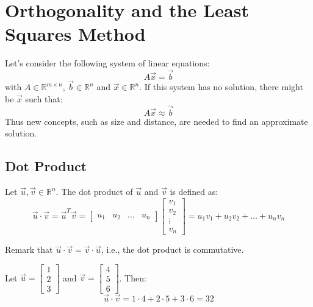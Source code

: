 \chapter{Orthogonality and the Least Squares Method}
Let's consider the following system of linear equations:
\[
    A \vec{x} = \vec{b}
\]
with $A \in \mathbb{R}^{m \times n}$, $\vec{b} \in \mathbb{R}^n$ and $\vec{x} \in \mathbb{R}^n$. If this system has no solution, there might be $\vec{x}$ such that:
\[
    A \vec{x} \approx \vec{b}
\]
Thus new concepts, such as size and distance, are needed to find an approximate solution.

\section{Dot Product}
\begin{definition}
    Let $\vec{u}, \vec{v} \in \mathbb{R}^n$. The dot product of $\vec{u}$ and $\vec{v}$ is defined as:
    \[
        \vec{u} \cdot \vec{v} = \vec{u}^T \vec{v} = \begin{bmatrix}
            u_1 & u_2 & \ldots & u_n
        \end{bmatrix} \begin{bmatrix}
            v_1 \\ v_2 \\ \vdots \\ v_n
        \end{bmatrix} = u_1 v_1 + u_2 v_2 + \ldots + u_n v_n
    \]
\end{definition}
Remark that $\vec{u} \cdot \vec{v} = \vec{v} \cdot \vec{u}$, i.e., the dot product is commutative.

\begin{eg}
    Let $\vec{u} = \begin{bmatrix}
        1 \\ 2 \\ 3
    \end{bmatrix}$ and $\vec{v} = \begin{bmatrix}
        4 \\ 5 \\ 6
    \end{bmatrix}$. Then:
    \[
        \vec{u} \cdot \vec{v} = 1 \cdot 4 + 2 \cdot 5 + 3 \cdot 6 = 32
    \]
\end{eg}

